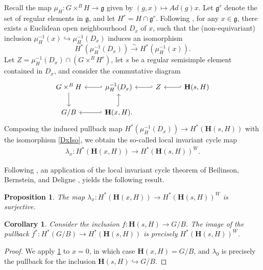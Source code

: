 \documentclass[10pt]{article}
\numberwithin{thm}{section}
\newtheorem{cor}[thm]{Corollary}
\newtheorem{prop}[thm]{Proposition}
\theoremstyle{definition}
\theoremstyle{remark}
\newcommand{\Fl}{\ensuremath{G/B}}
\newcommand{\g}{\ensuremath{\mathfrak g}}
\newcommand{\Hess}{\mathbf H}
\begin{document}
Recall the map $\mu_H:G\times^BH\to\g$ given by $(g,x)\mapsto Ad(g)x$.
Let $\g^r$ denote the set of regular elements in \g, and let $H^r=H\cap \g^r$.
Following \cite[Sec 4]{balibanu2020perverse},
for any $x\in\g$,
there exists a Euclidean open neighbourhood $D_x$ of $x$,
such that the (non-equivariant) inclusion $\mu_H^{-1}(x)\hookrightarrow\mu_H^{-1}(D_x)$ induces an isomorphism
\begin{equation}
\label{DxIso}
H^*(\mu_H^{-1}(D_x))\overset\sim\longrightarrow H^*(\mu_H^{-1}(x)).
\end{equation}
Let $Z=\mu_H^{-1}(D_x)\cap(G\times^BH^r)$,
let $s$ be a regular semisimple element contained in $D_x$, 
and consider the commutative diagram
\begin{equation}
\label{bigDiag}
\begin{tikzcd}
G\times^BH\arrow[d]\arrow[r,hookleftarrow]&\mu_H^{-1}(D_x)\arrow[r,hookleftarrow]&Z\arrow[r,hookleftarrow]&\Hess(s,H)\\
G/B\arrow[r,hookleftarrow]&\Hess(x,H)\arrow[u,hook].
\end{tikzcd}
\end{equation}
Composing the induced pullback map $H^*(\mu_H^{-1}(D_x))\to H^*(\Hess(s,H))$
with the isomorphism \eqref{DxIso},
we obtain the so-called local invariant cycle map
\begin{align*}
\lambda_x:H^*(\Hess(x,H))\to H^*(\Hess(s,H))^W.
\end{align*}

Following \cite{balibanu2020perverse},
an application of the local invariant cycle theorem of Beilinson, Bernstein, and Deligne \cite{MR751966},
yields the following result. 

\begin{prop}
\label{bbd}
The map $\lambda_x:H^*(\Hess(x,H))\to H^*(\Hess(s,H))^W$ is surjective.
\end{prop}

\begin{cor}
Consider the inclusion $f:\Hess(s,H)\to G/B$.
The image of the pullback $f^*:H^*(\Fl)\to H^*(\Hess(s,H))$ is precisely $H^*(\Hess(s,H))^W$.
\end{cor}
\begin{proof}
We apply \cref{bbd} to $x=0$, in which case $\Hess(x,H)=G/B$,
and
$\lambda_0$ is precisely the pullback for the inclusion $\Hess(s,H)\hookrightarrow G/B$.
\end{proof}
\end{document}
